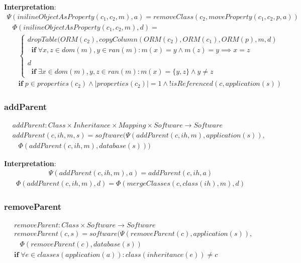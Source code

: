 \documentclass[10pt]{article}
\begin{document}
\noindent \textbf{Interpretation}:
\begin{align}
\Psi(inilineObjectAsProperty(c_1, c_2, m), a) =  removeClass(c_2, moveProperty(c_1, c_2, p, a))  
\end{align}
\begin{align}
& \Phi(inilineObjectAsProperty(c_1, c_2, m), d) = \nonumber \\ 
& \;\;\; \begin{cases}
 dropTable(ORM(c_2), copyColumn(ORM(c_2), ORM(c_1), ORM(p), m, d) \\
\;\; \mathbf{if} \;  \forall x, z \in dom(m), y \in ran(m) : m(x) = y \land  
 m(z) = y \implies x = z 
 \\\\
 d \\
 \;\; \mathbf{if} \; \exists x \in dom(m), y, z \in ran(m) : m(x) = \{y, z\} \land y \neq z
 \end{cases} \nonumber \\
& \;\;\; \mathbf{if} \; p \in properties(c_2) \land |properties(c_2)| = 1 \land ! isReferenced(c,application(s)) 
\end{align}



\subsubsection{addParent}
\begin{align}
& addParent: Class \times Inheritance \times Mapping \times Software \rightarrow Software \nonumber \\
& addParent(c, ih, m, s) = software(\Psi(addParent(c, ih, m), application(s)), \nonumber \\
& \;\;\;  \Phi(addParent(c, ih, m), database(s)))
\end{align}

\noindent \textbf{Interpretation}:
\begin{align}
\Psi(addParent(c, ih, m), a) = addParent(c, ih, a)
\end{align}
\begin{align}
\Phi(addParent(c, ih, m), d) = \Phi(mergeClasses(c, class(ih), m), d)
\end{align}

\subsubsection{removeParent}
\begin{align}
& removeParent: Class \times Software \rightarrow Software \nonumber \\
& removeParent(c, s) = software(\Psi(removeParent(c), application(s)), \nonumber \\
& \;\;\;  \Phi(removeParent(c), database(s)) \nonumber \\
& \mathbf{if} \; \forall e \in classes(application(a)) : class(inheritance(e)) \neq c
\end{align}
\end{document}
